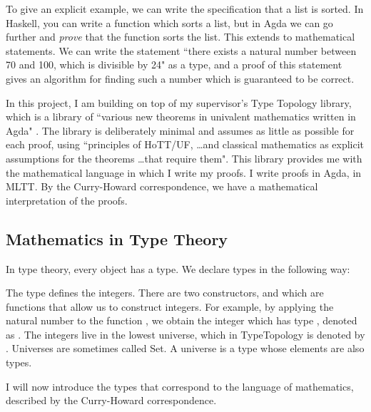 \documentclass[ProjectReport]{subfiles}
\begin{document}
To give an explicit example, we can write the specification that a list is sorted. In Haskell, you can write a function which sorts a list, but in Agda we can go further and \textit{prove} that the function sorts the list. This extends to mathematical statements. We can write the statement ``there exists a natural number between 70 and 100, which is divisible by 24" as a type, and a proof of this statement gives an algorithm for finding such a number which is guaranteed to be correct.

In this project, I am building on top of my supervisor's Type Topology library, which is a library of ``various new theorems in univalent mathematics written in Agda" \cite{TypeTopology}. The library is deliberately minimal and assumes as little as possible for each proof, using ``principles of HoTT/UF, \ldots and classical mathematics as explicit assumptions for the theorems \ldots that require them". This library provides me with the mathematical language in which I write my proofs. I write proofs in Agda, in MLTT. By the Curry-Howard correspondence, we have a mathematical interpretation of the proofs.

\subsection{Mathematics in Type Theory}

In type theory, every object has a type. We declare types in the following way:

\TypeExample



The type  defines the integers. There are two constructors,  and  which are functions that allow us to construct integers. For example, by applying the natural number  to the function , we obtain the integer \AgdaSpace{} which has type , denoted as
\AgdaSpace{}%
\AgdaSymbol{:}\AgdaSpace{}%
.
The integers live in the lowest universe, which in TypeTopology is denoted by . Universes are sometimes called Set. A universe is a type whose elements are also types.

I will now introduce the types that correspond to the language of mathematics, described by the Curry-Howard correspondence. 
\end{document}
